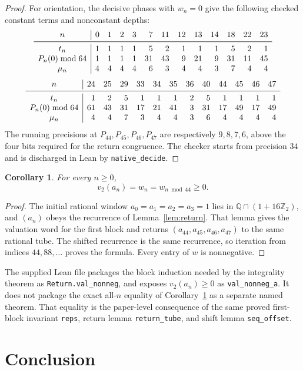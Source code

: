 \documentclass[11pt]{article}
\newtheorem{corollary}[theorem]{Corollary}
\theoremstyle{remark}
\newcommand{\Q}{\mathbb{Q}}
\newcommand{\Ztwo}{\mathbb{Z}_2}
\newcommand{\vt}{v_2}
\begin{document}
\begin{proof}
For orientation, the decisive phases with $w_n=0$ give the following checked
constant terms and nonconstant depths:
\[
\begin{array}{c|rrrrrrrrrrrr}
n & 0&1&2&3&7&11&12&13&14&18&22&23\\
\midrule
t_n & 1&1&1&1&5&2&1&1&1&5&2&1\\
P_n(0)\bmod64 & 1&1&1&1&31&43&9&21&9&31&11&45\\
\mu_n & 4&4&4&4&6&3&4&4&3&7&4&4
\end{array}
\]
\[
\begin{array}{c|rrrrrrrrrrrr}
n & 24&25&29&33&34&35&36&40&44&45&46&47\\
\midrule
t_n & 1&2&5&1&1&1&2&5&1&1&1&1\\
P_n(0)\bmod64 & 61&43&31&17&21&41&3&31&17&49&17&49\\
\mu_n & 4&4&7&3&4&4&3&6&4&4&4&4
\end{array}
\]
The running precisions at $P_{44},P_{45},P_{46},P_{47}$ are respectively
$9,8,7,6$, above the four bits required for the return congruence.  The checker
starts from precision $34$ and is discharged in Lean by \texttt{native\_decide}.
\end{proof}

\begin{corollary}\label{cor:two}
For every $n\ge0$,
\[
\vt(a_n)=w_n=w_{n\bmod44}\ge0.
\]
\end{corollary}
\begin{proof}
The initial rational window $a_0=a_1=a_2=a_3=1$ lies in
$\Q\cap(1+16\Ztwo)$, and $(a_n)$ obeys the recurrence of
Lemma~\ref{lem:return}.  That lemma gives the valuation word for the first
block and returns $(a_{44},a_{45},a_{46},a_{47})$ to the same rational tube.
The shifted recurrence is the same recurrence, so iteration from indices
$44,88,\dots$ proves the formula.  Every entry of $w$ is nonnegative.
\end{proof}

The supplied Lean file packages the block induction needed by the integrality
theorem as \texttt{Return.val\_nonneg}, and exposes
$\vt(a_n)\ge0$ as \texttt{val\_nonneg\_a}.  It does not package the exact
all-$n$ equality of Corollary~\ref{cor:two} as a separate named theorem.  That
equality is the paper-level consequence of the same proved first-block
invariant \texttt{reps}, return lemma \texttt{return\_tube}, and shift lemma
\texttt{seq\_offset}.

\section{Conclusion}\label{sec:conclusion}
\end{document}
